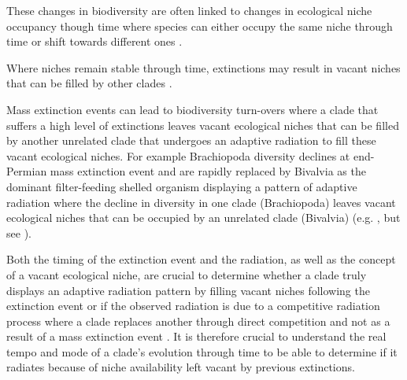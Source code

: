 \documentclass[12pt,letterpaper]{article}
\begin{document}
These changes in biodiversity are often linked to changes in ecological niche occupancy though time where species can either occupy the same niche through time or shift towards different ones \citep{Pearman2008149}. 

Where niches remain stable through time, extinctions may result in vacant niches that can be filled by other clades \citep{Pearman2008149}. 

Mass extinction events can lead to biodiversity turn-overs where a clade that suffers a high level of extinctions leaves vacant ecological niches that can be filled by another unrelated clade that undergoes an adaptive radiation to fill these vacant ecological niches. For example Brachiopoda diversity declines at end-Permian mass extinction event and are rapidly replaced by Bivalvia as the dominant filter-feeding shelled organism displaying a pattern of adaptive radiation where the decline in diversity in one clade (Brachiopoda) leaves vacant ecological niches that can be occupied by an unrelated clade (Bivalvia) (e.g. \citealt{Sepkiski1981}, \citealt{CLAPHAM01102006} but see \citealt{Payne22052014}).


Both the timing of the extinction event and the radiation, as well as the concept 
of a vacant ecological niche, are crucial to determine whether a clade truly displays an adaptive radiation pattern by filling vacant niches following the extinction event or if the observed radiation is due to a competitive radiation process where a clade replaces another through direct competition and not as a result of a mass extinction event \citep[e.g.][]{Brusatte12092008,bentonmodels2014}. It is therefore crucial to understand the real tempo and mode of a clade's evolution through time to be able to determine if it radiates because of niche availability left vacant by previous extinctions.



\end{document}
